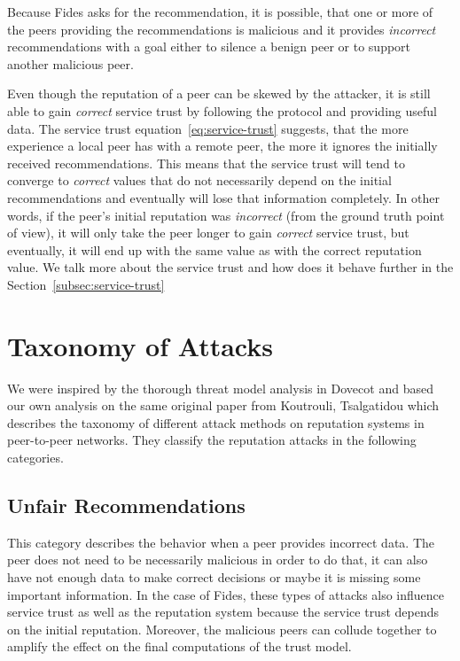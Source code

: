 Because Fides asks for the recommendation, it is possible, that one or more of the peers providing the recommendations is malicious and it provides \textit{incorrect} recommendations with a goal either to silence a benign peer or to support another malicious peer.

Even though the reputation of a peer can be skewed by the attacker, it is still able to gain \textit{correct} service trust by following the protocol and providing useful data.
The service trust equation~\ref{eq:service-trust} suggests, that  the more experience a local peer has with a remote peer, the more it ignores the initially received recommendations.
This means that the service trust will tend to converge to \textit{correct} values that do not necessarily depend on the initial recommendations and eventually will lose that information completely.
In other words, if the peer's initial reputation was \textit{incorrect} (from the ground truth point of view), it will only take the peer longer to gain \textit{correct} service trust, but eventually, it will end up with the same value as with the correct reputation value.
We talk more about the service trust and how does it behave further in the Section~\ref{subsec:service-trust}

\section{Taxonomy of Attacks}
\label{sec:taxonomy-of-attacks}
We were inspired by the thorough threat model analysis in Dovecot \cite{dita}  and based our own analysis on the same original paper from Koutrouli, Tsalgatidou \cite{KOUTROULI201247} which describes the taxonomy of different attack methods on reputation systems in peer-to-peer networks.
They classify the reputation attacks in the following categories.

\subsection{Unfair Recommendations}
\label{subsec:unfair-recommendations}
This category describes the behavior when a peer provides incorrect data.
The peer does not need to be necessarily malicious in order to do that, it can also have not enough data to make correct decisions or maybe it is missing some important information.
In the case of Fides, these types of attacks also influence service trust as well as the reputation system because the service trust depends on the initial reputation.
Moreover, the malicious peers can collude together to amplify the effect on the final computations of the trust model.

